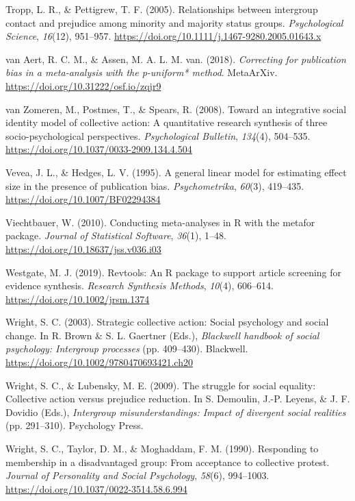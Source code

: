 \documentclass[12pt, letterpaper]{article}
\begin{document}
\leavevmode\hypertarget{ref-tropp_relationships_2005}{}%
Tropp, L. R., \& Pettigrew, T. F. (2005). Relationships between
intergroup contact and prejudice among minority and majority status
groups. \emph{Psychological Science}, \emph{16}(12), 951--957.
\url{https://doi.org/10.1111/j.1467-9280.2005.01643.x}

\leavevmode\hypertarget{ref-van_aert_correcting_2018}{}%
van Aert, R. C. M., \& Assen, M. A. L. M. van. (2018). \emph{Correcting
for publication bias in a meta-analysis with the p-uniform* method}.
MetaArXiv. \url{https://doi.org/10.31222/osf.io/zqjr9}

\leavevmode\hypertarget{ref-van_zomeren_toward_2008}{}%
van Zomeren, M., Postmes, T., \& Spears, R. (2008). Toward an
integrative social identity model of collective action: A quantitative
research synthesis of three socio-psychological perspectives.
\emph{Psychological Bulletin}, \emph{134}(4), 504--535.
\url{https://doi.org/10.1037/0033-2909.134.4.504}

\leavevmode\hypertarget{ref-vevea_general_1995}{}%
Vevea, J. L., \& Hedges, L. V. (1995). A general linear model for
estimating effect size in the presence of publication bias.
\emph{Psychometrika}, \emph{60}(3), 419--435.
\url{https://doi.org/10.1007/BF02294384}

\leavevmode\hypertarget{ref-viechtbauer_conducting_2010}{}%
Viechtbauer, W. (2010). Conducting meta-analyses in R with the metafor
package. \emph{Journal of Statistical Software}, \emph{36}(1), 1--48.
\url{https://doi.org/10.18637/jss.v036.i03}

\leavevmode\hypertarget{ref-westgate_revtools:_2019}{}%
Westgate, M. J. (2019). Revtools: An R package to support article
screening for evidence synthesis. \emph{Research Synthesis Methods},
\emph{10}(4), 606--614. \url{https://doi.org/10.1002/jrsm.1374}

\leavevmode\hypertarget{ref-brown_strategic_2003}{}%
Wright, S. C. (2003). Strategic collective action: Social psychology and
social change. In R. Brown \& S. L. Gaertner (Eds.), \emph{Blackwell
handbook of social psychology: Intergroup processes} (pp. 409--430).
Blackwell. \url{https://doi.org/10.1002/9780470693421.ch20}

\leavevmode\hypertarget{ref-wright_struggle_2009}{}%
Wright, S. C., \& Lubensky, M. E. (2009). The struggle for social
equality: Collective action versus prejudice reduction. In S. Demoulin,
J.-P. Leyens, \& J. F. Dovidio (Eds.), \emph{Intergroup
misunderstandings: Impact of divergent social realities} (pp. 291--310).
Psychology Press.

\leavevmode\hypertarget{ref-wright_responding_1990}{}%
Wright, S. C., Taylor, D. M., \& Moghaddam, F. M. (1990). Responding to
membership in a disadvantaged group: From acceptance to collective
protest. \emph{Journal of Personality and Social Psychology},
\emph{58}(6), 994--1003.
\url{https://doi.org/10.1037/0022-3514.58.6.994}

\endgroup
\end{document}
